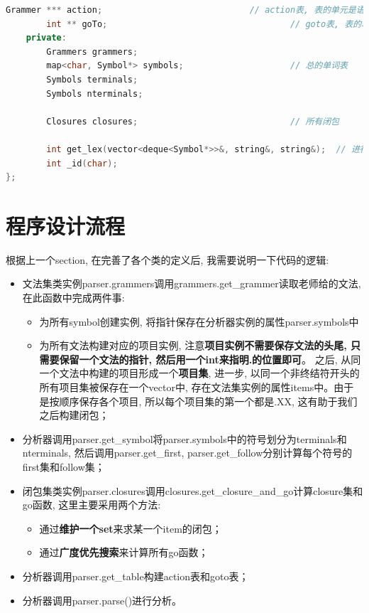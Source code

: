 \documentclass{zpt}
\begin{document}
\begin{lstlisting}[language=c++]
        Grammer *** action;                             // action表, 表的单元是语法类的指针
        int ** goTo;                                    // goto表, 表的单元是状态序号
    private:
        Grammers grammers;
        map<char, Symbol*> symbols;                     // 总的单词表
        Symbols terminals;
        Symbols nterminals;

        Closures closures;                              // 所有闭包

        int get_lex(vector<deque<Symbol*>>&, string&, string&);  // 进行词法分析的函数
        int _id(char);
};
    \end{lstlisting}

    \section{程序设计流程}
    根据上一个section, 在完善了各个类的定义后, 我需要说明一下代码的逻辑:\begin{itemize}
        \item 文法集类实例parser.grammers调用grammers.get\_grammer读取老师给的文法, 在此函数中完成两件事:\begin{itemize}
            \item 为所有symbol创建实例, 将指针保存在分析器实例的属性parser.symbols中
            \item 为所有文法构建对应的项目实例, 注意\textbf{项目实例不需要保存文法的头尾, 只需要保留一个文法的指针, 然后用一个int来指明.的位置即可}。 之后, 从同一个文法中构建的项目形成一个\textbf{项目集}, 进一步, 以同一个非终结符开头的所有项目集被保存在一个vector中, 存在文法集实例的属性items中。由于是按顺序保存各个项目, 所以每个项目集的第一个都是.XX, 这有助于我们之后构建闭包；
        \end{itemize}
        \item 分析器调用parser.get\_symbol将parser.symbols中的符号划分为terminals和nterminals, 然后调用parser.get\_first, parser.get\_follow分别计算每个符号的first集和follow集；
        \item 闭包集类实例parser.closures调用closures.get\_closure\_and\_go计算closure集和go函数, 这里主要采用两个方法:\begin{itemize}
            \item 通过\textbf{维护一个set}来求某一个item的闭包；
            \item 通过\textbf{广度优先搜索}来计算所有go函数；
        \end{itemize}
        \item 分析器调用parser.get\_table构建action表和goto表；
        \item 分析器调用parser.parse()进行分析。
    \end{itemize}
\end{document}
